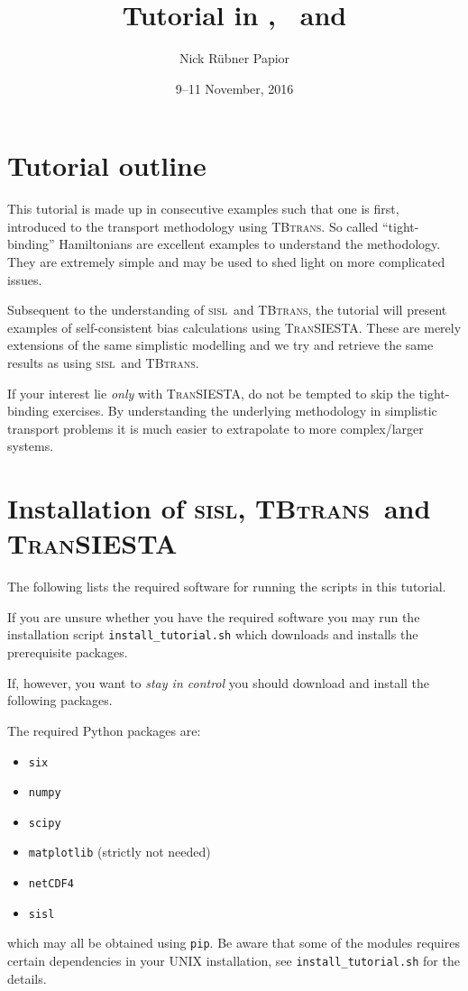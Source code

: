 \documentclass[10pt]{article}
\title{Tutorial in \sisl, \tbt\ and \ts}
\author{Nick R\"ubner Papior}
\date{9--11 November, 2016}
\newcommand\sisl{\textsc{sisl}}
\newcommand\tbt{\textsc{TBtrans}}
\newcommand\ts{\textsc{TranSIESTA}}
\newcommand\script[1]{\texttt{#1}}
\newcounter{example}
\begin{document}
\maketitle

\tableofcontents


\section{Tutorial outline}

This tutorial is made up in consecutive examples such that one is first, introduced to the
transport methodology using \tbt. So called ``tight-binding'' Hamiltonians are excellent
examples to understand the methodology. They are extremely simple and may be used to shed
light on more complicated issues.

Subsequent to the understanding of \sisl\ and \tbt, the tutorial will present examples of
self-consistent bias calculations using \ts. These are merely extensions of the same
simplistic modelling and we try and retrieve the same results as using \sisl\ and \tbt.

If your interest lie \emph{only} with \ts, do not be tempted to skip the tight-binding
exercises. By understanding the underlying methodology in simplistic transport problems it
is much easier to extrapolate to more complex/larger systems.



\section{Installation of \sisl, \tbt\ and \ts}

The following lists the required software for running the scripts in this tutorial.

If you are unsure whether you have the required software you may run the installation
script \script{install\_tutorial.sh} which downloads and installs the prerequisite
packages. 

If, however, you want to \emph{stay in control} you should download and install
the following packages.

The required Python packages are:
\begin{itemize}
  \itemsep=0pt
  \parskip=0pt
  \item \script{six}
  \item \script{numpy}
  \item \script{scipy}
  \item \script{matplotlib} (strictly not needed)
  \item \script{netCDF4}
  \item \script{sisl}
\end{itemize}
which may all be obtained using \script{pip}. Be aware that some of the modules requires
certain dependencies in your UNIX installation, see \script{install\_tutorial.sh} for the
details.
\end{document}
